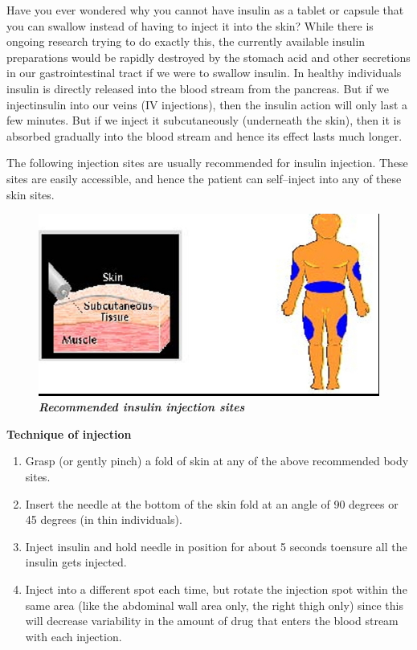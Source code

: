 Have you ever wondered why you cannot have insulin as a tablet or capsule that you can swallow instead of having to inject it into the skin? While there is ongoing research trying to do exactly this, the currently available insulin preparations would be rapidly destroyed by the stomach acid and other secretions in our gastrointestinal tract if we were to swallow insulin. In healthy individuals insulin is directly released into the blood stream from the pancreas. But if we inject\break insulin into our veins (IV injections), then the insulin action will only last a few minutes. But if we inject it subcutaneously (underneath the skin), then it is absorbed gradually into the blood stream and hence its effect lasts much longer.

The following injection sites are usually recommended for insulin injection. These sites are easily accessible, and hence the patient can self–inject into any of these skin sites.

\begin{figure}[h]
\centering
\includegraphics[scale=1.6]{images/089.jpg}\\
\textbf{\textit{Recommended insulin injection sites}}
\end{figure}

\noindent\textbf{Technique of injection}

\begin{enumerate}[•]
\itemsep=0pt
\item Grasp (or gently pinch) a fold of skin at any of the above reco\-mmended body sites.
\item Insert the needle at the bottom of the skin fold at an angle of 90 degrees or 45 degrees (in thin individuals).
\item Inject insulin and hold needle in position for about 5 seconds to\break ensure all the insulin gets injected.
\item Inject into a different spot each time, but rotate the injection spot within the same area (like the abdominal wall area only, the right thigh only) since this will decrease variability in the amount of drug that enters the blood stream with each injection.
\end{enumerate}

